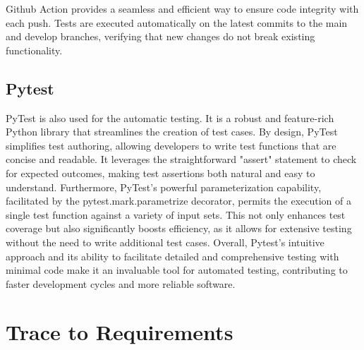 \documentclass[12pt, titlepage]{article}
\begin{document}
Github Action provides a seamless and efficient way to ensure code integrity
with each push. Tests are executed automatically on the latest commits to the
main and develop branches, verifying that new changes do not break existing
functionality.

\subsection{Pytest}
PyTest is also used for the automatic testing. It is a robust and feature-rich
Python library that streamlines the creation of test cases. By design, PyTest
simplifies test authoring, allowing developers to write test functions that are
concise and readable. It leverages the straightforward "assert" statement to
check for expected outcomes, making test assertions both natural and easy to
understand. Furthermore, PyTest's powerful parameterization capability,
facilitated by the pytest.mark.parametrize decorator, permits the execution of a
single test function against a variety of input sets. This not only enhances
test coverage but also significantly boosts efficiency, as it allows for
extensive testing without the need to write additional test cases. Overall,
Pytest's intuitive approach and its ability to facilitate detailed and
comprehensive testing with minimal code make it an invaluable tool for automated
testing, contributing to faster development cycles and more reliable software.

\section{Trace to Requirements}
\end{document}
